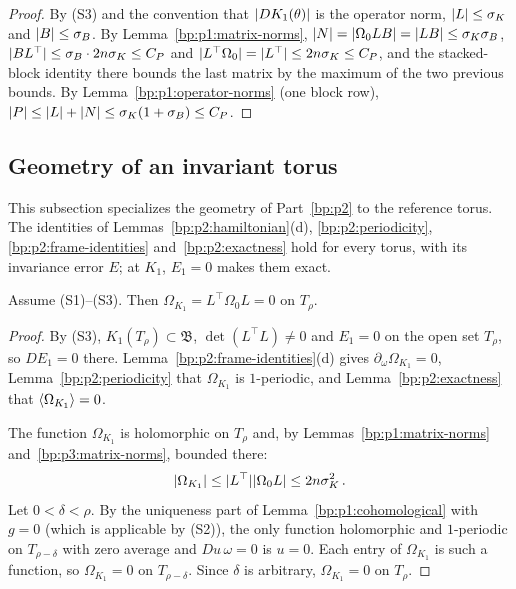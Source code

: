 \begin{proof}
\label{step:p3:norms-frame}
By (S3) and the convention that $\lvert DK_1(\theta)\rvert$ is the operator norm, $\lvert L\rvert\le\sigma_K$ and
$\lvert B\rvert\le\sigma_B$. By Lemma~\ref{bp:p1:matrix-norms}, $\lvert N\rvert=\lvert \Omega_0LB\rvert=\lvert LB\rvert\le\sigma_K\sigma_B$,
$\lvert BL^\top\rvert\le\sigma_B\cdot2n\sigma_K\le C_P$ and $\lvert L^\top\Omega_0\rvert=\lvert L^\top\rvert\le2n\sigma_K\le C_P$, and
the stacked-block identity there bounds the last matrix by the maximum of the two previous bounds. By
Lemma~\ref{bp:p1:operator-norms} (one block row), $\lvert P\rvert\le\lvert L\rvert+\lvert N\rvert\le\sigma_K(1+\sigma_B)\le C_P$.
\end{proof}

\subsection{Geometry of an invariant torus}\label{bp:p3:geometry}

This subsection specializes the geometry of Part~\ref{bp:p2} to the reference torus. The identities of
Lemmas~\ref{bp:p2:hamiltonian}(d), \ref{bp:p2:periodicity}, \ref{bp:p2:frame-identities}
and~\ref{bp:p2:exactness} hold for every torus, with its invariance error $E$; at $K_1$, $E_1=0$ makes
them exact.

\begin{lemma}\label{bp:p3:lagrangian}
Assume (S1)--(S3). Then $\Omega_{K_1}=L^\top\Omega_0L=0$ on $T_\rho$.
\end{lemma}

\begin{proof}
\label{step:p3:lagrangian-transport}
By (S3), $K_1(T_\rho)\subset\mathfrak B$, $\det(L^\top L)\ne0$ and $E_1=0$ on the open set $T_\rho$, so
$DE_1=0$ there. Lemma~\ref{bp:p2:frame-identities}(d) gives $\partial_\omega\Omega_{K_1}=0$,
Lemma~\ref{bp:p2:periodicity} that $\Omega_{K_1}$ is $1$-periodic, and Lemma~\ref{bp:p2:exactness} that
$\langle \Omega_{K_1}\rangle=0$.

\label{step:p3:lagrangian-unique}
The function $\Omega_{K_1}$ is holomorphic on $T_\rho$ and, by Lemmas~\ref{bp:p1:matrix-norms}
and~\ref{bp:p3:matrix-norms}, bounded there:
\begin{equation*}
\lvert \Omega_{K_1}\rvert\le\lvert L^\top\rvert\lvert \Omega_0L\rvert\le2n\sigma_K^2\,.
\end{equation*}
Let $0<\delta<\rho$.
By the uniqueness part of Lemma~\ref{bp:p1:cohomological} with $g=0$ (which is applicable by (S2)),
the only function holomorphic and $1$-periodic on $T_{\rho-\delta}$ with zero average and
$Du\,\omega=0$ is $u=0$. Each entry of $\Omega_{K_1}$ is such a function, so $\Omega_{K_1}=0$ on
$T_{\rho-\delta}$. Since $\delta$ is arbitrary, $\Omega_{K_1}=0$ on $T_\rho$.
\end{proof}


